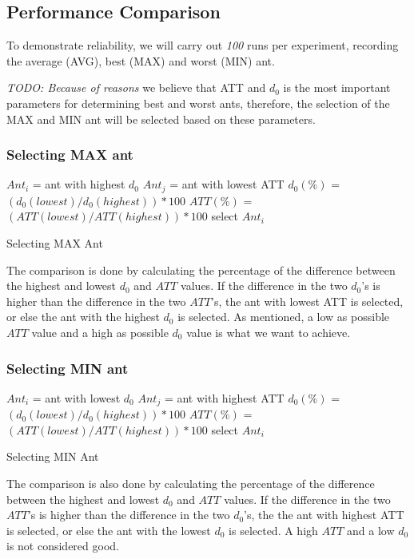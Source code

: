 \subsection{Performance Comparison}

To demonstrate reliability, we will carry out \emph{\color{blue}100} runs per experiment, recording the average (AVG), best (MAX) and worst (MIN) ant.  

\emph{\color{blue} TODO: Because of reasons }we believe that ATT and $d_0$ is the most important parameters for determining best and worst ants, therefore, the selection of the MAX and MIN ant will be selected based on these parameters. 

\subsubsection{Selecting MAX ant}
\begin{algorithm}[H]
$Ant_{i}$ = ant with highest $d_0$\;
$Ant_{j}$ = ant with lowest ATT\;
{
	$d_0(\%)$ = $(d_0(lowest) / d_0(highest))*100$\;
	$ATT(\%)$ = $(ATT(lowest) / ATT(highest))*100$\;
	{
		select $Ant_{i}$
	}
}
 \caption{Selecting MAX Ant}
\end{algorithm}


The comparison is done by calculating the percentage of the difference between the highest and lowest $d_0$ and $ATT$ values. If the difference in the two $d_0$'s is higher than the difference in the two $ATT$'s, the ant with lowest ATT is selected, or else the ant with the highest $d_0$ is selected. As mentioned, a low as possible $ATT$ value and a high as possible $d_0$ value is what we want to achieve.

\subsubsection{Selecting MIN ant}
\begin{algorithm}[H]
$Ant_{i}$ = ant with lowest $d_0$\;
$Ant_{j}$ = ant with highest ATT\;
{
	$d_0(\%)$ = $(d_0(lowest) / d_0(highest))*100$\;
	$ATT(\%)$ = $(ATT(lowest) / ATT(highest))*100$\;
	{
		select $Ant_{i}$
	}
}
 \caption{Selecting MIN Ant}

\end{algorithm}

The comparison is also done by calculating the percentage of the difference between the highest and lowest $d_0$ and $ATT$ values. If the difference in the two $ATT$'s is higher than the difference in the two $d_0$'s, the the ant with highest ATT is selected, or else the ant with the lowest $d_0$ is selected. A high $ATT$ and a low $d_0$ is not considered good. 

